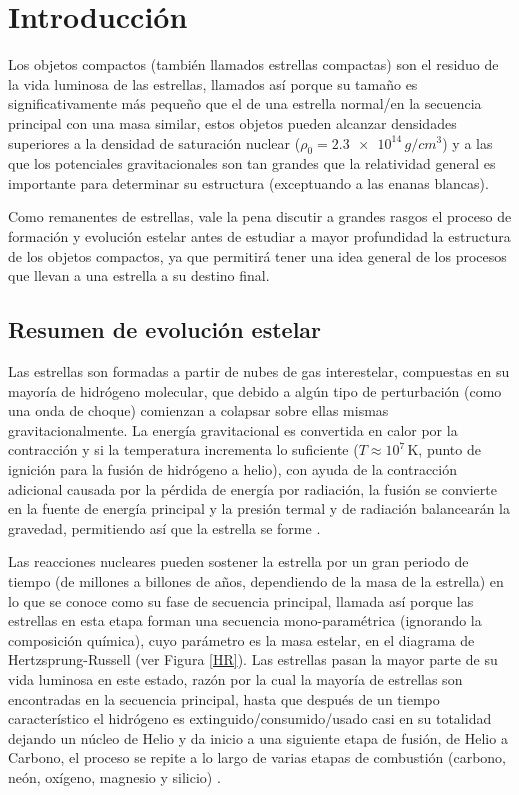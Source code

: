 \chapter{Introducción}

Los objetos compactos (también llamados estrellas compactas) son el residuo de la vida luminosa de las estrellas, llamados así porque su tamaño es significativamente más pequeño que el de una estrella normal/en la secuencia principal con una masa similar, estos objetos pueden alcanzar densidades superiores a la densidad de saturación nuclear  ($\rho_0=\num{2.3e+14}\,\si{g/cm^3}$) y a las que los potenciales gravitacionales son tan grandes que la relatividad general es importante para determinar su estructura (exceptuando a las enanas blancas). 

Como remanentes de estrellas, vale la pena discutir a grandes rasgos el proceso de formación y evolución estelar antes de estudiar a mayor profundidad la estructura de los objetos compactos, ya que permitirá tener una idea general de los procesos que llevan a una estrella a su destino final.    

\section{Resumen de evolución estelar}
Las estrellas son formadas a partir de nubes de gas interestelar, compuestas en su mayoría de hidrógeno molecular, que debido a algún tipo de perturbación (como una onda de choque) comienzan a colapsar sobre ellas mismas gravitacionalmente. La energía gravitacional es convertida en calor por la contracción y si la temperatura incrementa lo suficiente ($T \approx 10^7 \, \si{\kelvin}$, punto de ignición para la fusión de hidrógeno a helio), con ayuda de la contracción adicional causada por la pérdida de energía por radiación, la fusión se convierte en la fuente de energía principal y la presión termal y de radiación balancearán la gravedad, permitiendo así que la estrella se forme \cite{Glendenning2000CompactStars}.

Las reacciones nucleares pueden sostener la estrella por un gran periodo de tiempo (de millones a billones de años, dependiendo de la masa de la estrella) en lo que se conoce como su fase de secuencia principal, llamada así porque las estrellas en esta etapa forman una secuencia mono-paramétrica (ignorando la composición química), cuyo parámetro es la masa estelar, en el diagrama de Hertzsprung-Russell (ver Figura \ref{HR}).
Las estrellas pasan la mayor parte de su vida luminosa en este estado, razón por la cual la mayoría de estrellas son encontradas en la secuencia principal, hasta que después de un tiempo característico el hidrógeno es extinguido/consumido/usado casi en su totalidad dejando un núcleo de Helio y da inicio a una siguiente etapa de fusión, de Helio a Carbono, el proceso se repite a lo largo de varias etapas de combustión (carbono, neón, oxígeno, magnesio y silicio) \cite{Scilla2016IntroductionEvolution}. 

